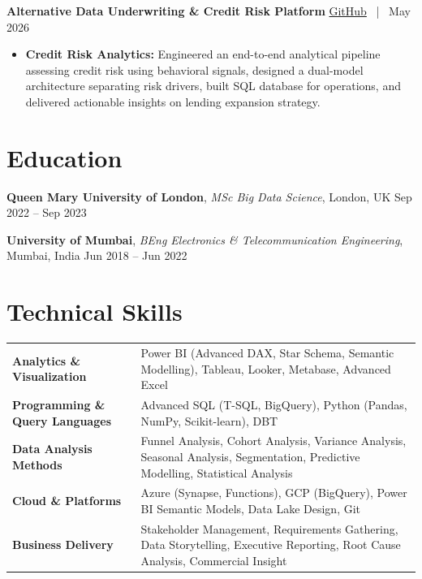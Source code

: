\documentclass[10pt, a4paper]{article}
\begin{document}
\textbf{Alternative Data Underwriting \& Credit Risk Platform} \hfill \href{https://github.com/VishalP44/Thin-File-Borrower-Risk-Assessment-Platform}{GitHub} \, | \, May 2026
\begin{itemize}
    \item \textbf{Credit Risk Analytics:} Engineered an end-to-end analytical pipeline assessing credit risk using behavioral signals, designed a dual-model architecture separating risk drivers, built SQL database for operations, and delivered actionable insights on lending expansion strategy.
\end{itemize}

\section*{Education}

\textbf{Queen Mary University of London}, \textit{MSc Big Data Science}, London, UK \hfill Sep 2022 -- Sep 2023

\vspace{4pt}

\textbf{University of Mumbai}, \textit{BEng Electronics \& Telecommunication Engineering}, Mumbai, India \hfill Jun 2018 -- Jun 2022

\section*{Technical Skills}

\begin{tabularx}{\textwidth}{>{\bfseries}l X}
    Analytics \& Visualization & Power BI (Advanced DAX, Star Schema, Semantic Modelling), Tableau, Looker, Metabase, Advanced Excel \\
    Programming \& Query Languages & Advanced SQL (T-SQL, BigQuery), Python (Pandas, NumPy, Scikit-learn), DBT \\
    Data Analysis Methods & Funnel Analysis, Cohort Analysis, Variance Analysis, Seasonal Analysis, Segmentation, Predictive Modelling, Statistical Analysis \\
    Cloud \& Platforms & Azure (Synapse, Functions), GCP (BigQuery), Power BI Semantic Models, Data Lake Design, Git \\
    Business Delivery & Stakeholder Management, Requirements Gathering, Data Storytelling, Executive Reporting, Root Cause Analysis, Commercial Insight
\end{tabularx}
\end{document}
